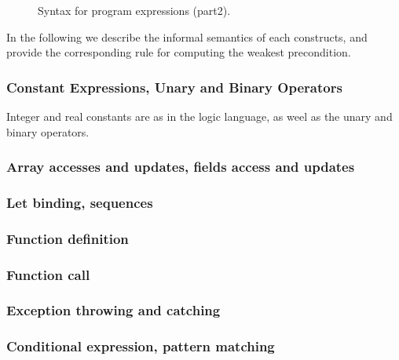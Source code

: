 \begin{figure}
  \begin{center}\framebox{}\end{center}
  \caption{Syntax for program expressions (part2).}
\label{fig:bnf:exprb}
\end{figure}

In the following we describe the informal semantics of each
constructs, and provide the corresponding rule for computing the
weakest precondition.


\subsubsection{Constant Expressions, Unary and Binary Operators}


Integer and real constants are as in the logic language, as weel as the unary and binary operators.


\subsubsection{Array accesses and updates, fields access and updates}

\todo{}

\subsubsection{Let binding, sequences}

\todo{}

\subsubsection{Function definition}


\subsubsection{Function call}

\todo{}

\subsubsection{Exception throwing and catching}


\subsubsection{Conditional expression, pattern matching}

